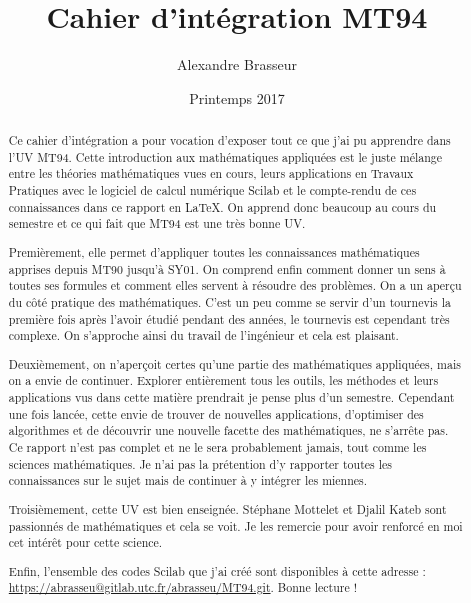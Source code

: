 \documentclass[a4paper,10pt,titlepage,openany]{report}
\title{Cahier d'intégration MT94}
\author{Alexandre Brasseur}
\date{Printemps 2017}
\begin{document}
	
	\thispagestyle{empty}
	
	\tableofcontents
	\label{sommaire}
	\thispagestyle{empty}		%


	\begin{abstract}
		Ce cahier d'intégration a pour vocation d'exposer tout ce que j'ai pu apprendre dans l'UV MT94.
		Cette introduction aux mathématiques appliquées est le juste mélange entre les théories mathématiques vues en cours, leurs applications en Travaux Pratiques avec le logiciel de calcul numérique Scilab et le compte-rendu de ces connaissances dans ce rapport en \LaTeX. On apprend donc beaucoup au cours du semestre et ce qui fait que MT94 est une très bonne UV.
		
		\medskip
		Premièrement, elle permet d'appliquer toutes les connaissances mathématiques apprises depuis MT90 jusqu'à SY01. On comprend enfin comment donner un sens à toutes ses formules et comment elles servent à résoudre des problèmes. On a un aperçu du côté pratique des mathématiques. C'est un peu comme se servir d'un tournevis la première fois après l'avoir étudié pendant des années, le tournevis est cependant très complexe. On s'approche ainsi du travail de l'ingénieur et cela est plaisant.

		\smallskip
		Deuxièmement, on n'aperçoit certes qu'une partie des mathématiques appliquées, mais on a envie de continuer. Explorer entièrement tous les outils, les méthodes et leurs applications vus dans cette matière prendrait je pense plus d'un semestre. Cependant une fois lancée, cette envie de trouver de nouvelles applications, d'optimiser des algorithmes et de découvrir une nouvelle facette des mathématiques, ne s'arrête pas. Ce rapport n'est pas complet et ne le sera probablement jamais, tout comme les sciences mathématiques. Je n'ai pas la prétention d'y rapporter toutes les connaissances sur le sujet mais de continuer à y intégrer les miennes.

		\smallskip
		Troisièmement, cette UV est bien enseignée. Stéphane Mottelet et Djalil Kateb sont passionnés de mathématiques et cela se voit. Je les remercie pour avoir renforcé en moi cet intérêt pour cette science.	

		Enfin, l'ensemble des codes Scilab que j'ai créé sont disponibles à cette adresse : \\ \url{https://abrasseu@gitlab.utc.fr/abrasseu/MT94.git}. Bonne lecture !

	\end{abstract}
	
\end{document}
